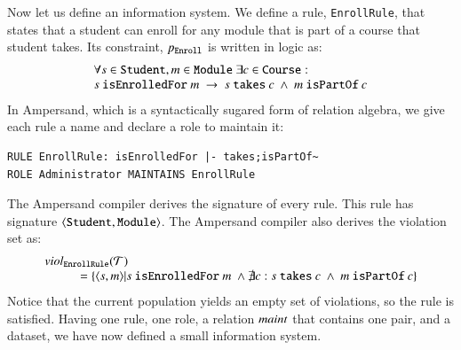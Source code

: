\documentclass{elsarticle}
\begin{document}
   Now let us define an information system.
   We define a rule, {\tt EnrollRule}, that states that a student can enroll for any module that is part of a course that student takes.
   Its constraint, $p_{\tt Enroll}$ is written in logic as:
\[\begin{array}{l}\forall s\in\text{\tt Student}, m\in\text{\tt Module}\ \exists c\in\text{\tt Course}:\\
s\ \text{\tt isEnrolledFor}\ m\ \rightarrow\ s\ \text{\tt takes}\ c\ \wedge\ m\ \text{\tt isPartOf}\ c
\end{array}\]
   In Ampersand, which is a syntactically sugared form of relation algebra,
   we give each rule a name and declare a role to maintain it:
\begin{verbatim}
RULE EnrollRule: isEnrolledFor |- takes;isPartOf~
ROLE Administrator MAINTAINS EnrollRule
\end{verbatim}
   The Ampersand compiler derives the signature of every rule.
   This rule has signature $\langle{\text{\tt Student}},{\text{\tt Module}}\rangle$.
   The Ampersand compiler also derives the violation set as:
\[\begin{array}{l}
   \viol{\text{\tt EnrollRule}}{\triples}\\
   \hspace{1cm}=\{\pair{s}{m}|s\ \text{\tt isEnrolledFor}\ m\ \wedge\not\exists c: s\ \text{\tt takes}\ c\ \wedge\ m\ \text{\tt isPartOf}\ c\}
\end{array}\]
   Notice that the current population yields an empty set of violations,
   so the rule is satisfied.
   Having one rule, one role, a relation $\text{\it maint\/}$ that contains one pair, and a dataset,
   we have now defined a small information system.
\end{document}
